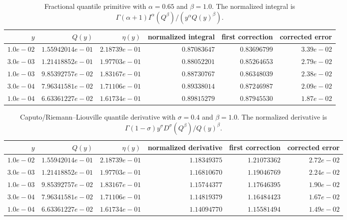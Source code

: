 \begin{table}[htbp]
\centering\small
\begin{tabular}{@{}rrrrrr@{}}
\toprule
$y$ & $Q(y)$ & $\eta(y)$ & normalized integral & first correction & corrected error\\
\midrule
$1.0e-02$ & $1.55942014e-01$ & $2.18739e-01$ & $0.87083647$ & $0.83696799$ & $3.39e-02$\\
$3.0e-03$ & $1.21418852e-01$ & $1.97703e-01$ & $0.88052201$ & $0.85264653$ & $2.79e-02$\\
$1.0e-03$ & $9.85392757e-02$ & $1.83167e-01$ & $0.88730767$ & $0.86348039$ & $2.38e-02$\\
$3.0e-04$ & $7.96341581e-02$ & $1.71106e-01$ & $0.89338014$ & $0.87246987$ & $2.09e-02$\\
$1.0e-04$ & $6.63361227e-02$ & $1.61734e-01$ & $0.89815279$ & $0.87945530$ & $1.87e-02$\\
\bottomrule\end{tabular}
\caption{Fractional quantile primitive with $\alpha=0.65$ and $\beta=1.0$. The normalized integral is $\Gamma(\alpha+1)I^\alpha(Q^\beta)/(y^\alpha Q(y)^\beta)$.}
\label{tab:quantile-frac-int}
\end{table}
\begin{table}[htbp]
\centering\small
\begin{tabular}{@{}rrrrrr@{}}
\toprule
$y$ & $Q(y)$ & $\eta(y)$ & normalized derivative & first correction & corrected error\\
\midrule
$1.0e-02$ & $1.55942014e-01$ & $2.18739e-01$ & $1.18349375$ & $1.21073362$ & $2.72e-02$\\
$3.0e-03$ & $1.21418852e-01$ & $1.97703e-01$ & $1.16810670$ & $1.19046769$ & $2.24e-02$\\
$1.0e-03$ & $9.85392757e-02$ & $1.83167e-01$ & $1.15744377$ & $1.17646395$ & $1.90e-02$\\
$3.0e-04$ & $7.96341581e-02$ & $1.71106e-01$ & $1.14819379$ & $1.16484423$ & $1.67e-02$\\
$1.0e-04$ & $6.63361227e-02$ & $1.61734e-01$ & $1.14094770$ & $1.15581494$ & $1.49e-02$\\
\bottomrule\end{tabular}
\caption{Caputo/Riemann--Liouville quantile derivative with $\sigma=0.4$ and $\beta=1.0$.  The normalized derivative is $\Gamma(1-\sigma)y^\sigma D^\sigma(Q^\beta)/Q(y)^\beta$.}
\label{tab:quantile-frac-der}
\end{table}
